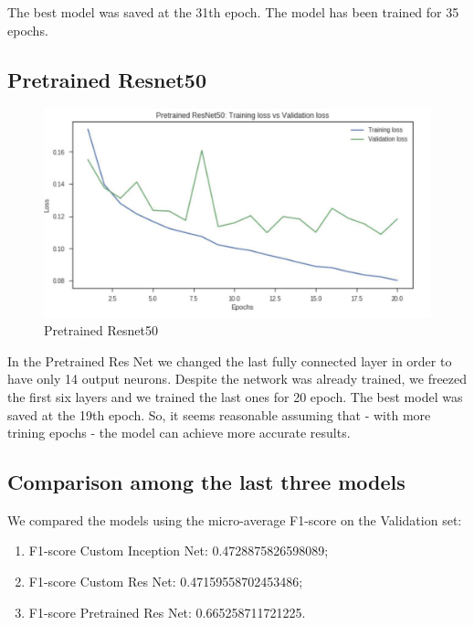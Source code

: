 The best model was saved at the 31th epoch. The model has been trained for 35 epochs.
\newpage
\subsection{Pretrained Resnet50}

\begin{figure}[!h]
	\begin{center}
		\includegraphics[width=0.5\linewidth]{images/pretrained_resnet50_loss.jpg}
		\caption{Pretrained Resnet50}
		\label{fig:pret-resnet-loss}
	\end{center}
\end{figure}

In the Pretrained Res Net we changed the last fully connected layer in order to have only 14 output neurons. Despite the network was already trained, we freezed the first six layers and we trained the last ones for 20 epoch. The best model was saved at the 19th epoch. So, it seems reasonable assuming that - with more trining epochs - the model can achieve more accurate results.

\subsection{Comparison among the last three models}
We compared the models using the micro-average F1-score on the Validation set:
\begin{enumerate}
	\item F1-score Custom Inception Net: 0.4728875826598089;
	\item F1-score Custom Res Net: 0.47159558702453486;
	\item F1-score Pretrained Res Net: 0.665258711721225.
\end{enumerate}

